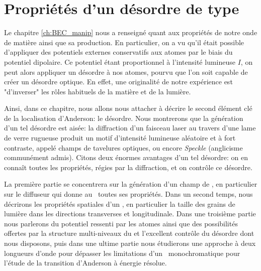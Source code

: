 
\chapter{Propriétés d'un désordre de type \speckle}
\label{ch:Speckle}

Le chapitre \ref{ch:BEC_manip} nous a renseigné quant aux propriétés de notre onde de matière ainsi que sa production. En particulier, on a vu qu'il était possible d'appliquer des potentiels externes conservatifs aux atomes par le biais du potentiel dipolaire. Ce potentiel étant proportionnel à l'intensité lumineuse $I$, on peut alors appliquer un désordre à nos atomes, pourvu que l'on soit capable de créer un désordre optique. En effet, une originalité de notre expérience est "d'inverser" les rôles habituels de la matière et de la lumière.

Ainsi, dans ce chapitre, nous allons nous attacher à décrire le second élément clé de la localisation d'Anderson: le désordre. Nous montrerons que la génération d'un tel désordre est aisée: la diffraction d'un faisceau laser au travers d'une lame de verre rugueuse produit un motif d'intensité lumineuse aléatoire et à fort contraste, appelé champs de tavelures optiques, ou encore \emph{Speckle} (anglicisme communément admis). Citons deux énormes avantages d'un tel désordre: on en connaît toutes les propriétés, régies par la diffraction, et on contrôle ce désordre. 

La première partie se concentrera sur la génération d'un champ de \speckle , en particulier sur le diffuseur qui donne au \speckle\ toutes ses propriétés. Dans un second temps, nous décrirons les propriétés spatiales d'un \speckle , en particulier la taille des grains de lumière dans les directions transverses et longitudinale. Dans une troisième partie nous parlerons du potentiel ressenti par les atomes ainsi que des possibilités offertes par la structure multi-niveaux du  et l'excellent contrôle du désordre dont nous disposons, puis dans une ultime partie nous étudierons une approche à deux longueurs d'onde pour dépasser les limitations d'un \speckle\ monochromatique pour l'étude de la transition d'Anderson à énergie résolue. 

